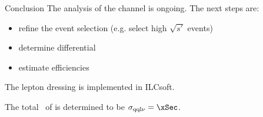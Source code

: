 \documentclass{beamer}
\newcommand{\figurepath}{../analysis/fig/fig_ex}
\newcommand{\tripleFigDistance}{\vspace{-1.2em}}
\begin{document}
\begin{frame}{Conclusion}
The analysis of the \eeto\qqln channel is ongoing. The next steps are:
\begin{itemize}
\item refine the event selection (e.g. select high $\sqrt{s'}$ events)
\item determine differential 
\item estimate efficiencies
\end{itemize}

\vspace{1em}
The lepton dressing is implemented in ILCsoft.

\vspace{1em}
The total \xsec\ of \eeto\qqln is determined to be $\sigma_\mathrm{\qqln} = \xSec$.


\vspace{1em}
\end{frame}




\end{document}
